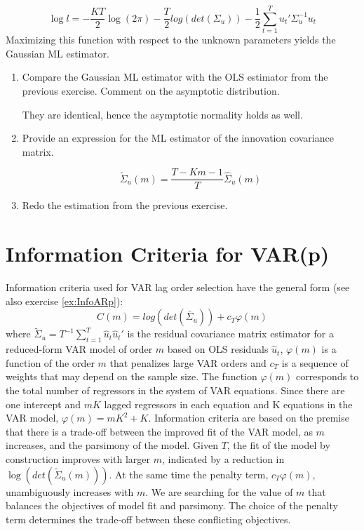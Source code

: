 \documentclass[a4paper]{scrartcl}
\begin{document}
$$\log l = -\frac{KT}{2}\log(2\pi) - \frac{T}{2}log(det(\Sigma_u))- \frac{1}{2}\sum_{t=1}^Tu_t'\Sigma_u^{-1}u_t$$
Maximizing this function with respect to the unknown parameters yields the Gaussian ML estimator.
\begin{enumerate}
	\item Compare the Gaussian ML estimator with the OLS estimator from the previous exercise. Comment on the asymptotic distribution.
	\begin{solution}
		They are identical, hence the asymptotic normality holds as well.
	\end{solution}
	\item Provide an expression for the ML estimator of the innovation covariance matrix.
	\begin{solution}
		$$\tilde{\Sigma}_u(m) = \frac{T-Km-1}{T}\hat{\Sigma}_u(m)$$
	\end{solution}
	\item Redo the estimation from the previous exercise.
	\begin{solution}
		
	\end{solution}
\end{enumerate}

\newpage
\section{Information Criteria for VAR(p)}
Information criteria used for VAR lag order selection have the general form (see also exercise \ref{ex:InfoARp}):
$$C(m) = log(det(\tilde{\Sigma_u})) + c_T \varphi(m)$$
where $\tilde{\Sigma}_u=T^{-1}\sum_{t=1}^T \hat{u}_t\hat{u}_t'$ is the residual covariance matrix estimator for a reduced-form VAR model of order $m$ based on OLS residuals $\hat{u}_t$, $\varphi(m)$ is a function of the order $m$ that penalizes large VAR orders and $c_T$ is a sequence of weights that may depend on the sample size.
The function $\varphi(m)$ corresponds to the total number of regressors in the system of VAR equations. Since there are one intercept and $mK$ lagged regressors in each equation and K equations in the VAR model, $\varphi(m)= mK^2 + K$. Information criteria are based on the premise that there is a trade-off between the improved fit of the VAR model, as $m$ increases, and the parsimony of the model. Given $T$, the fit of the model by construction improves with larger $m$, indicated by a reduction in $\log(det(\tilde{\Sigma}_u(m)))$. At the same time the penalty term, $c_T \varphi(m)$, unambiguously increases with $m$. We are searching for the value of $m$ that balances the objectives of model fit and parsimony. The choice of the penalty term determines the trade-off between these conflicting objectives. 
\end{document}

